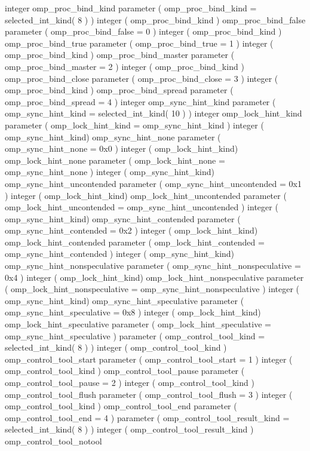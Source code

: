 {\begin{ompfSyntax}
     integer omp_proc_bind_kind
     parameter ( omp_proc_bind_kind = selected_int_kind( 8 ) )
     integer ( omp_proc_bind_kind ) omp_proc_bind_false
     parameter ( omp_proc_bind_false = 0 )
     integer ( omp_proc_bind_kind ) omp_proc_bind_true
     parameter ( omp_proc_bind_true = 1 )
     integer ( omp_proc_bind_kind ) omp_proc_bind_master
     parameter ( omp_proc_bind_master = 2 )
     integer ( omp_proc_bind_kind ) omp_proc_bind_close
     parameter ( omp_proc_bind_close = 3 )
     integer ( omp_proc_bind_kind ) omp_proc_bind_spread
     parameter ( omp_proc_bind_spread = 4 )
     integer omp_sync_hint_kind
     parameter ( omp_sync_hint_kind = selected_int_kind( 10 ) )
     integer omp_lock_hint_kind
     parameter ( omp_lock_hint_kind = omp_sync_hint_kind )
     integer ( omp_sync_hint_kind) omp_sync_hint_none
     parameter ( omp_sync_hint_none = 0x0 )
     integer ( omp_lock_hint_kind) omp_lock_hint_none
     parameter ( omp_lock_hint_none = omp_sync_hint_none )
     integer ( omp_sync_hint_kind) omp_sync_hint_uncontended
     parameter ( omp_sync_hint_uncontended = 0x1 )
     integer ( omp_lock_hint_kind) omp_lock_hint_uncontended
     parameter ( omp_lock_hint_uncontended = omp_sync_hint_uncontended )
     integer ( omp_sync_hint_kind) omp_sync_hint_contended
     parameter ( omp_sync_hint_contended = 0x2 )
     integer ( omp_lock_hint_kind) omp_lock_hint_contended
     parameter ( omp_lock_hint_contended = omp_sync_hint_contended )
     integer ( omp_sync_hint_kind) omp_sync_hint_nonspeculative
     parameter ( omp_sync_hint_nonspeculative = 0x4 )
     integer ( omp_lock_hint_kind) omp_lock_hint_nonspeculative
     parameter ( omp_lock_hint_nonspeculative = omp_sync_hint_nonspeculative )
     integer ( omp_sync_hint_kind) omp_sync_hint_speculative
     parameter ( omp_sync_hint_speculative = 0x8 )
     integer ( omp_lock_hint_kind) omp_lock_hint_speculative
     parameter ( omp_lock_hint_speculative = omp_sync_hint_speculative )
     parameter ( omp_control_tool_kind = selected_int_kind( 8 ) )
     integer ( omp_control_tool_kind ) omp_control_tool_start
     parameter ( omp_control_tool_start = 1 )
     integer ( omp_control_tool_kind ) omp_control_tool_pause
     parameter ( omp_control_tool_pause = 2 )
     integer ( omp_control_tool_kind ) omp_control_tool_flush
     parameter ( omp_control_tool_flush = 3 )
     integer ( omp_control_tool_kind ) omp_control_tool_end
     parameter ( omp_control_tool_end = 4 )
     parameter ( omp_control_tool_result_kind = selected_int_kind( 8 ) )
     integer ( omp_control_tool_result_kind ) omp_control_tool_notool

\end{ompfSyntax}}

